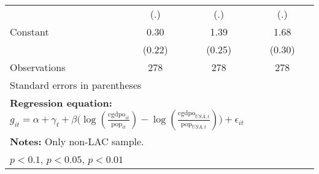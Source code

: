 \begin{table}[htbp]
\begin{tabular}{l*{3}{c}}
                &      (.)         &      (.)         &      (.)         \\
\addlinespace
Constant        &     0.30         &     1.39\sym{***}&     1.68\sym{***}\\
                &   (0.22)         &   (0.25)         &   (0.30)         \\
\midrule
Observations    &      278         &      278         &      278         \\
\bottomrule
\multicolumn{4}{l}{\footnotesize Standard errors in parentheses}\\
\multicolumn{4}{l}{\footnotesize \textbf{Regression equation:} \(g_{it} = \alpha + \gamma_t + \beta \big(\log (\frac{\textrm{cgdpo}_{it}}{\textrm{pop}_{it}} ) - \log (\frac{\textrm{cgdpo}_{USA,t}}{\textrm{pop}_{USA,t}}  ) \big) + \epsilon_{it}\)}\\
\multicolumn{4}{l}{\footnotesize \textbf{Notes:} Only non-LAC sample.}\\
\multicolumn{4}{l}{\footnotesize \sym{*} \(p<0.1\), \sym{**} \(p<0.05\), \sym{***} \(p<0.01\)}\\
\end{tabular}
\end{table}
